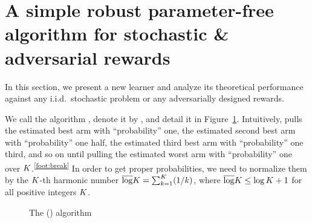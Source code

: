%
\section{A simple robust parameter-free algorithm for stochastic \& adversarial rewards}
\label{s:UpperBOB}
%
In this section, we present a new learner 
and analyze its theoretical performance against any i.i.d.\, stochastic 
problem or any adversarially designed rewards.

We call the algorithm \ProbabilityONE{}, denote it by \Pone{}, %
and detail it in Figure~\ref{fig:probaoneAlgo}.
Intuitively,  \Pone{} pulls the estimated best arm with 
``probability'' one, the estimated second best arm with ``probability'' 
one half, the estimated third best arm with ``probability'' one 
third, and so on until pulling the estimated worst arm with ``probability'' one over $K$.\textsuperscript{\ref{foot:break}} 
In order to get proper probabilities, we need to normalize  
them by the $K$-th harmonic number %
$\overline\log K =\sum_{k=1}^K (1/k)$, where $\overline\log K\leq \log K+1$ for all positive integers $K$.
\begin{figure}[H]
	\centering
	\caption{The \ProbabilityONE{} (\Pone{}) algorithm}\label{fig:probaoneAlgo}
\end{figure}
